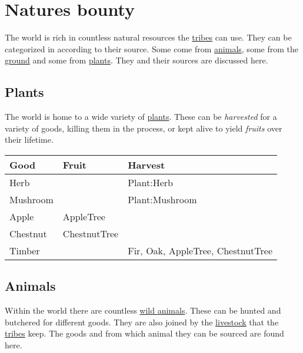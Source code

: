 \section{Natures bounty}\label{ch:Goods:Nature}

The world is rich in countless natural resources the
\hyperref[ch:Tribes]{tribes} can use. They can be categorized in according to
their source. Some come from \hyperref[ch:World:Inhabitants:Animals]{animals},
some from the \hyperref[ch:World:Minerals]{ground} and some from
\hyperref[ch:World:Plants]{plants}. They and their sources are discussed here.

\subsection{Plants}\label{ch:Goods:Nature:Plants}

The world is home to a wide variety of \hyperref[ch:World:Plants]{plants}.
These can be \emph{harvested} for a variety of goods, killing them in the
process, or kept alive to yield \emph{fruits} over their lifetime.

\begin{longtable}{lll}
	\toprule
	Good           & Fruit              & Harvest                                                   \\
	\midrule
	\Gls{Herb}     &                    & \Gls{Plant:Herb}                                          \\
	\Gls{Mushroom} &                    & \Gls{Plant:Mushroom}                                      \\
	\Gls{Apple}    & \Gls{AppleTree}    &                                                           \\
	\Gls{Chestnut} & \Gls{ChestnutTree} &                                                           \\
	\Gls{Timber}   &                    & \Gls{Fir}, \gls{Oak}, \gls{AppleTree}, \gls{ChestnutTree} \\
	\bottomrule
\end{longtable}

\subsection{Animals}\label{ch:Goods:Nature:Animals}

Within the world there are countless
\hyperref[ch:World:Inhabitants:Animals]{wild animals}. These can be hunted and
butchered for different goods. They are also joined by the
\hyperref[ch:World:Inhabitants:Livestock]{livestock} that the
\hyperref[ch:Tribes]{tribes} keep. The goods and from which animal they can be
sourced are found here.

